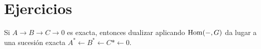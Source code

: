 \documentclass[TA.tex]{subfiles}
\begin{document}
\section{Ejercicios}
\begin{ejer}
Si $A\to B\to C\to 0$ es exacta, entonces dualizar aplicando $\operatorname{Hom}(-,G)$ da lugar a una sucesión exacta $A^*\leftarrow B^*\leftarrow C*\leftarrow 0$.
\end{ejer}
\end{document}
